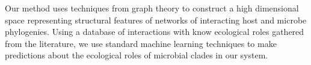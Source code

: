Our method uses techniques from graph theory to construct a high dimensional space representing structural features of networks of interacting host and microbe phylogenies. Using a database of interactions with know ecological roles gathered from the literature, we use standard machine learning techniques to make predictions about the ecological roles of microbial clades in our system.
